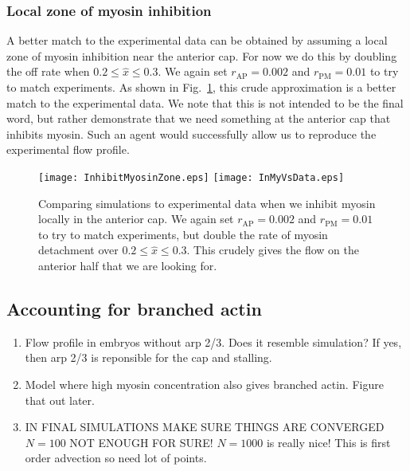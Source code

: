 \documentclass[11pt]{article}
\newcommand{\red}[1]{\color{red}#1\normalcolor}
\newcommand{\6}[1]{#1_{\text{6}}}
\newcommand{\3}[1]{#1_{\text{3}}}
\begin{document}
\subsubsection{Local zone of myosin inhibition}
A better match to the experimental data can be obtained by assuming a local zone of myosin inhibition near the anterior cap. For now we do this by doubling the off rate when $0.2 \leq \hat x \leq 0.3$. We again set $r_\text{AP}=0.002$ and $r_\text{PM}=0.01$ to try to match experiments. As shown in Fig.\ \ref{fig:InhibitMyLocal}, this crude approximation is a better match to the experimental data. We note that this is not intended to be the final word, but rather demonstrate that we need something at the anterior cap that inhibits myosin. Such an agent would successfully allow us to reproduce the experimental flow profile.

\begin{figure}
\centering
\texttt{[image: InhibitMyosinZone.eps]}
\texttt{[image: InMyVsData.eps]}
\caption{\label{fig:InhibitMyLocal} Comparing simulations to experimental data when we inhibit myosin locally in the anterior cap. We again set $r_\text{AP}=0.002$ and $r_\text{PM}=0.01$ to try to match experiments, but double the rate of myosin detachment over $0.2 \leq \hat x \leq 0.3$. This crudely gives the flow on the anterior half that we are looking for.}
\end{figure}



\subsection{Accounting for branched actin}
\red{\begin{enumerate}
\item Flow profile in embryos without arp 2/3. Does it resemble simulation? If yes, then arp 2/3 is reponsible for the cap and stalling.
\item Model where high myosin concentration also gives branched actin. Figure that out later.
\item IN FINAL SIMULATIONS MAKE SURE THINGS ARE CONVERGED $N=100$ NOT ENOUGH FOR SURE! $N=1000$ is really nice! This is first order advection so need lot of points.
\end{enumerate}}





\iffalse
\end{document}
